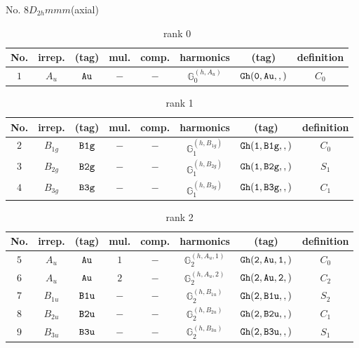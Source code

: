 \documentclass[fleqn,8pt]{jsarticle}
\begin{document}
\setcounter{MaxMatrixCols}{16}

\begin{center}
\LARGE
No. 8\quad$D_{2h}$\quad$mmm$\quad[ orthorhombic ] (axial)
\end{center}
\begin{table}[ht!]
\begin{center}
\caption{rank 0}
\renewcommand{\arraystretch}{1.3}
\begin{tabular}{cccccccc} \hline \hline
No. & irrep. & (tag) & mul. & comp. & harmonics & (tag) & definition \\ \hline
$ 1 $ & $ A_{u} $ & $ {\tt Au} $ & $ - $ & $ - $ & $ \mathbb{G}_{0}^{(h,A_{u})} $ & $ {\tt Gh(0,Au,,)} $ & $ C_{0} $ \\
 \hline \hline
\end{tabular}
\end{center}
\end{table}
\begin{table}[ht!]
\begin{center}
\caption{rank 1}
\renewcommand{\arraystretch}{1.3}
\begin{tabular}{cccccccc} \hline \hline
No. & irrep. & (tag) & mul. & comp. & harmonics & (tag) & definition \\ \hline
$ 2 $ & $ B_{1g} $ & $ {\tt B1g} $ & $ - $ & $ - $ & $ \mathbb{G}_{1}^{(h,B_{1g})} $ & $ {\tt Gh(1,B1g,,)} $ & $ C_{0} $ \\
$ 3 $ & $ B_{2g} $ & $ {\tt B2g} $ & $ - $ & $ - $ & $ \mathbb{G}_{1}^{(h,B_{2g})} $ & $ {\tt Gh(1,B2g,,)} $ & $ S_{1} $ \\
$ 4 $ & $ B_{3g} $ & $ {\tt B3g} $ & $ - $ & $ - $ & $ \mathbb{G}_{1}^{(h,B_{3g})} $ & $ {\tt Gh(1,B3g,,)} $ & $ C_{1} $ \\
 \hline \hline
\end{tabular}
\end{center}
\end{table}
\begin{table}[ht!]
\begin{center}
\caption{rank 2}
\renewcommand{\arraystretch}{1.3}
\begin{tabular}{cccccccc} \hline \hline
No. & irrep. & (tag) & mul. & comp. & harmonics & (tag) & definition \\ \hline
$ 5 $ & $ A_{u} $ & $ {\tt Au} $ & $ 1 $ & $ - $ & $ \mathbb{G}_{2}^{(h,A_{u},1)} $ & $ {\tt Gh(2,Au,1,)} $ & $ C_{0} $ \\
$ 6 $ & $ A_{u} $ & $ {\tt Au} $ & $ 2 $ & $ - $ & $ \mathbb{G}_{2}^{(h,A_{u},2)} $ & $ {\tt Gh(2,Au,2,)} $ & $ C_{2} $ \\
$ 7 $ & $ B_{1u} $ & $ {\tt B1u} $ & $ - $ & $ - $ & $ \mathbb{G}_{2}^{(h,B_{1u})} $ & $ {\tt Gh(2,B1u,,)} $ & $ S_{2} $ \\
$ 8 $ & $ B_{2u} $ & $ {\tt B2u} $ & $ - $ & $ - $ & $ \mathbb{G}_{2}^{(h,B_{2u})} $ & $ {\tt Gh(2,B2u,,)} $ & $ C_{1} $ \\
$ 9 $ & $ B_{3u} $ & $ {\tt B3u} $ & $ - $ & $ - $ & $ \mathbb{G}_{2}^{(h,B_{3u})} $ & $ {\tt Gh(2,B3u,,)} $ & $ S_{1} $ \\
 \hline \hline
\end{tabular}
\end{center}
\end{table}
\end{document}
